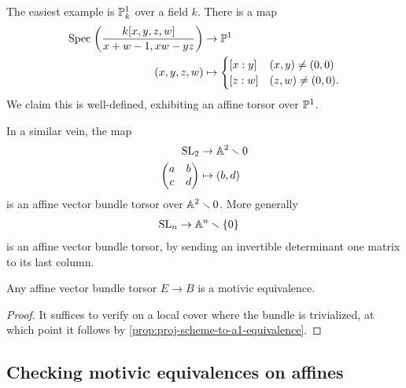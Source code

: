 \documentclass[11pt,openany]{book}
\begin{document}
\begin{example} The easiest example is $\P^1_k$ over a field $k$. There is a map
\begin{align*}
    \Spec \left( \frac{k[x,y,z,w]}{x+w-1,xw-yz} \right) &\to \P^1 \\
    (x,y,z,w) &\mapsto \begin{cases} [x:y] & (x,y)\ne (0,0) \\ [z:w] & (z,w)\ne (0,0). \end{cases}
\end{align*}
We claim this is well-defined, exhibiting an affine torsor over $\P^1$.
\end{example}

\begin{example} In a similar vein, the map
\begin{align*}
    \SL_2 &\to \A^2\minus 0 \\
    \begin{pmatrix} a & b \\ c & d \end{pmatrix} &\mapsto (b,d)
\end{align*}
is an affine vector bundle torsor over $\A^2\minus 0$. More generally
\begin{align*}
    \SL_n &\to \A^n\minus\{0\}
\end{align*}
is an affine vector bundle torsor, by sending an invertible determinant one matrix to its last column.
\end{example}

\begin{proposition} Any affine vector bundle torsor $E \to B$ is a motivic equivalence.
\end{proposition}
\begin{proof} It suffices to verify on a local cover where the bundle is trivialized, at which point it follows by \autoref{prop:proj-scheme-to-a1-equivalence}.
\end{proof}

\subsection{Checking motivic equivalences on affines}
\end{document}
